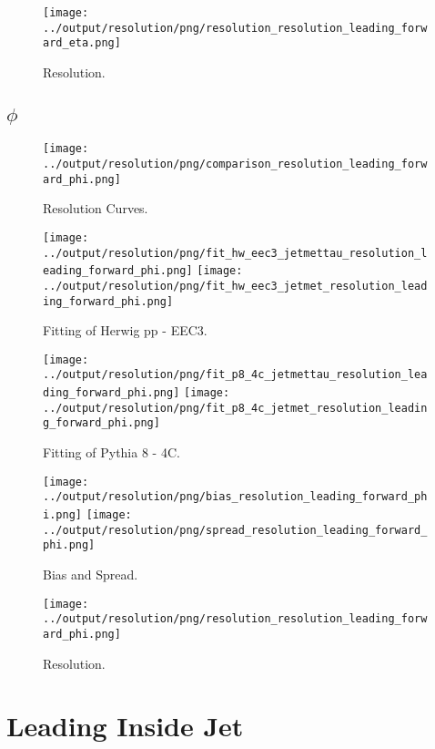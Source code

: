 \documentclass[11pt]{book}
\begin{document}
\begin{figure}[ht]
\centering
\texttt{[image: ../output/resolution/png/resolution\_resolution\_leading\_forward\_eta.png]}
\caption{Resolution.}
\end{figure}
\clearpage

\section{$\phi$}

\begin{figure}[ht]
\centering
\texttt{[image: ../output/resolution/png/comparison\_resolution\_leading\_forward\_phi.png]}
\caption{Resolution Curves.}
\end{figure}


\begin{figure}[ht]
\centering
\texttt{[image: ../output/resolution/png/fit\_hw\_eec3\_jetmettau\_resolution\_leading\_forward\_phi.png]}
\texttt{[image: ../output/resolution/png/fit\_hw\_eec3\_jetmet\_resolution\_leading\_forward\_phi.png]}
\caption{Fitting of Herwig pp - EEC3.}
\end{figure}

\begin{figure}[ht]
\centering
\texttt{[image: ../output/resolution/png/fit\_p8\_4c\_jetmettau\_resolution\_leading\_forward\_phi.png]}
\texttt{[image: ../output/resolution/png/fit\_p8\_4c\_jetmet\_resolution\_leading\_forward\_phi.png]}
\caption{Fitting of Pythia 8 - 4C.}
\end{figure}

\begin{figure}[ht]
\centering
\texttt{[image: ../output/resolution/png/bias\_resolution\_leading\_forward\_phi.png]}
\texttt{[image: ../output/resolution/png/spread\_resolution\_leading\_forward\_phi.png]}
\caption{Bias and Spread.}
\end{figure}


\begin{figure}[ht]
\centering
\texttt{[image: ../output/resolution/png/resolution\_resolution\_leading\_forward\_phi.png]}
\caption{Resolution.}
\end{figure}
\clearpage


\chapter{Leading Inside Jet}
\end{document}
